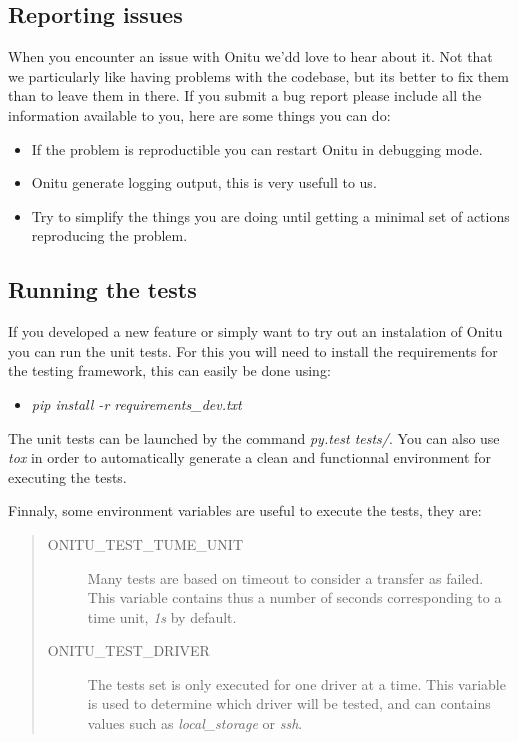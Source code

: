\documentclass[letterpaper,10pt,english]{sphinxmanual}
\begin{document}
\subsection{Reporting issues}
\label{contribute:reporting-issues}
When you encounter an issue with Onitu we'dd love to hear about it. Not that we particularly like having problems with the codebase, but its better to fix them than to leave them in there.
If you submit a bug report please include all the information available to you, here are some things you can do:
\begin{itemize}
\item {} 
If the problem is reproductible you can restart Onitu in debugging mode.

\item {} 
Onitu generate logging output, this is very usefull to us.

\item {} 
Try to simplify the things you are doing until getting a minimal set of actions reproducing the problem.

\end{itemize}


\subsection{Running the tests}
\label{contribute:tests}\label{contribute:running-the-tests}
If you developed a new feature or simply want to try out an instalation of Onitu you can run the unit tests. For this you will need to install the requirements for the testing framework, this can easily be done using:
\begin{itemize}
\item {} 
\emph{pip install -r requirements\_dev.txt}

\end{itemize}

The unit tests can be launched by the command \emph{py.test tests/}. You can also use \emph{tox} in order to automatically generate a clean and functionnal environment for executing the tests.

Finnaly, some environment variables are useful to execute the tests, they are:
\begin{quote}
\begin{description}
\item[{ONITU\_TEST\_TUME\_UNIT}] \leavevmode
Many tests are based on timeout to consider a transfer as failed. This variable contains thus a number of seconds corresponding to a time unit, \emph{1s} by default.

\item[{ONITU\_TEST\_DRIVER}] \leavevmode
The tests set is only executed for one driver at a time. This variable is used to determine which driver will be tested, and can contains values such as \emph{local\_storage} or \emph{ssh}.

\end{description}
\end{quote}
\end{document}
